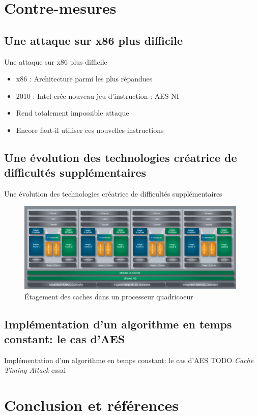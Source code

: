 \documentclass[11pt]{beamer}
\begin{document}
\section{Contre-mesures}

\subsection{Une attaque sur x86 plus difficile}
\begin{frame}{Une attaque sur x86 plus difficile}
	\begin{itemize}
		\item x86 : Architecture parmi les plus répandues
		\item 2010 : Intel crée nouveau jeu d'instruction : AES-NI
		\item Rend totalement impossible attaque
		\item Encore faut-il utiliser ces nouvelles instructions
	\end{itemize}
\end{frame}

\subsection{Une évolution des technologies créatrice de difficultés supplémentaires}
\begin{frame}{Une évolution des technologies créatrice de difficultés supplémentaires}
\begin{figure}[h]
  \centering
  \includegraphics[width=11cm]{figures/BDArch.png}
  \caption{Étagement des caches dans un processeur quadricoeur}
  \label{etagement} 
\end{figure}
\end{frame}

\subsection{Implémentation d'un algorithme en temps constant: le cas d'AES}
\begin{frame}{Implémentation d'un algorithme en temps constant: le cas d'AES}
TODO \emph{Cache Timing Attack} essai~\cite{canteaut2006understanding}
\end{frame}

\section*{Conclusion et  références}
\end{document}
